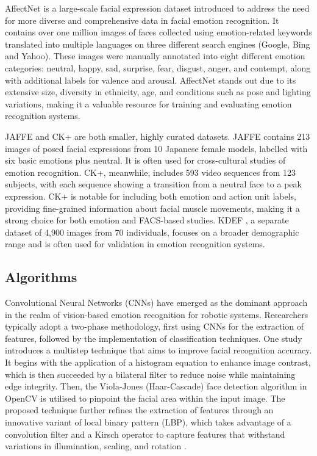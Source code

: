 AffectNet \cite{Mollahosseini2017-bj} is a large-scale facial expression dataset introduced to address the need for more diverse and comprehensive data in facial emotion recognition. It contains over one million images of faces collected using emotion-related keywords translated into multiple languages on three different search engines (Google, Bing and Yahoo). These images were manually annotated into eight different emotion categories: neutral, happy, sad, surprise, fear, disgust, anger, and contempt, along with additional labels for valence and arousal. AffectNet stands out due to its extensive size, diversity in ethnicity, age, and conditions such as pose and lighting variations, making it a valuable resource for training and evaluating emotion recognition systems.

JAFFE \cite{jaffe}  and CK+ are both smaller, highly curated datasets. JAFFE contains 213 images of posed facial expressions from 10 Japanese female models, labelled with six basic emotions plus neutral. It is often used for cross-cultural studies of emotion recognition. CK+, meanwhile, includes 593 video sequences from 123 subjects, with each sequence showing a transition from a neutral face to a peak expression. CK+ is notable for including both emotion and action unit labels, providing fine-grained information about facial muscle movements, making it a strong choice for both emotion and FACS-based studies. KDEF \cite{Lundqvist2015-in}, a separate dataset of 4,900 images from 70 individuals, focuses on a broader demographic range and is often used for validation in emotion recognition systems.

\subsection{Algorithms}

Convolutional Neural Networks (CNNs) have emerged as the dominant approach in the realm of vision-based emotion recognition for robotic systems. Researchers typically adopt a two-phase methodology, first using CNNs for the extraction of features, followed by the implementation of classification techniques. One study introduces a multistep technique that aims to improve facial recognition accuracy. It begins with the application of a histogram equation to enhance image contrast, which is then succeeded by a bilateral filter to reduce noise while maintaining edge integrity. Then, the Viola-Jones (Haar-Cascade) face detection algorithm in OpenCV is utilised to pinpoint the facial area within the input image. The proposed technique further refines the extraction of features through an innovative variant of local binary pattern (LBP), which takes advantage of a convolution filter and a Kirsch operator to capture features that withstand variations in illumination, scaling, and rotation \cite{Mistry2020-gr}.

